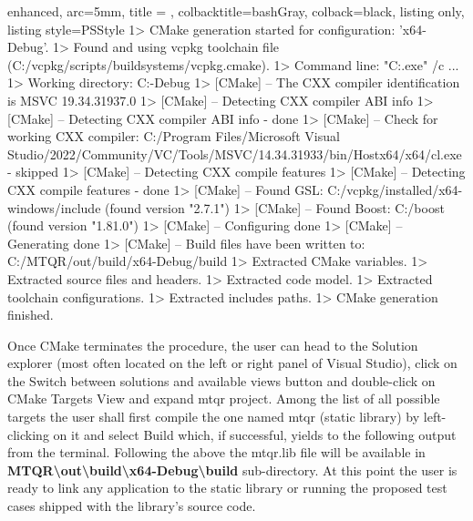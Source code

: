 \documentclass[a4paper, twosided]{book}
\begin{document}
\begin{tcblisting}{enhanced,
                   arc=5mm,
                   title = \color{black}{\large \ttfamily Build using Visual Studio},
                   colbacktitle=bashGray,
                   colback=black,
                   listing only,
                   listing style=PSStyle}
1> CMake generation started for configuration: 'x64-Debug'.
1> Found and using vcpkg toolchain file (C:/vcpkg/scripts/buildsystems/vcpkg.cmake).
1> Command line: "C:\WINDOWS{}\cmd.exe" /c  ...
1> Working directory: C:\MTQR\out\build{}-Debug
1> [CMake] -- The CXX compiler identification is MSVC 19.34.31937.0
1> [CMake] -- Detecting CXX compiler ABI info
1> [CMake] -- Detecting CXX compiler ABI info - done
1> [CMake] -- Check for working CXX compiler: C:/Program Files/Microsoft Visual Studio/2022/Community/VC/Tools/MSVC/14.34.31933/bin/Hostx64/x64/cl.exe - skipped
1> [CMake] -- Detecting CXX compile features
1> [CMake] -- Detecting CXX compile features - done
1> [CMake] -- Found GSL: C:/vcpkg/installed/x64-windows/include (found version "2.7.1") 
1> [CMake] -- Found Boost: C:/boost (found version "1.81.0")  
1> [CMake] -- Configuring done
1> [CMake] -- Generating done
1> [CMake] -- Build files have been written to: C:/MTQR/out/build/x64-Debug/build
1> Extracted CMake variables.
1> Extracted source files and headers.
1> Extracted code model.
1> Extracted toolchain configurations.
1> Extracted includes paths.
1> CMake generation finished.
\end{tcblisting}
\vspace{0.3cm}

\noindent
Once CMake terminates the procedure, the user can head to the \colorbox{poliGrayBlue}{Solution explorer} (most often located on the left or right panel of Visual Studio), click on the \colorbox{poliGrayBlue}{Switch between solutions and available views} button and double-click on \colorbox{poliGrayBlue}{CMake Targets View} and expand \colorbox{poliGrayBlue}{mtqr project}.
Among the list of all possible targets the user shall first compile the one named \colorbox{poliGrayBlue}{mtqr (static library)} by left-clicking on it and select \colorbox{poliGrayBlue}{Build} which, if successful, yields to the following output from the terminal.
\newline
Following the above the \colorbox{poliGrayBlue}{mtqr.lib} file will be available in \colorbox{poliGrayBlue}{\textbf{MTQR\textbackslash out\textbackslash build\textbackslash x64-Debug\textbackslash build}} sub-directory. At this point the user is ready to link any application to the static library or running the proposed test cases shipped with the library's source code.
\end{document}
